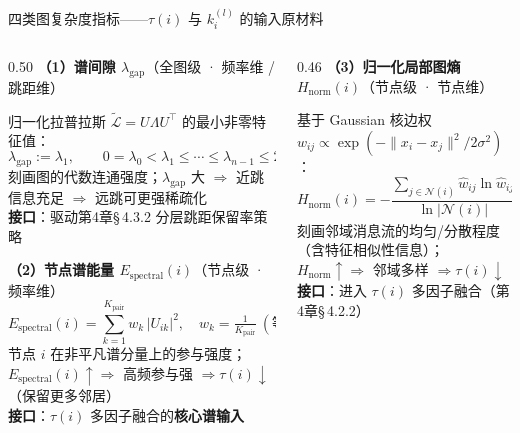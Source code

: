 \documentclass[aspectratio=169,9pt,xcolor=dvipsnames]{beamer}
\newcommand{\blue}[1]{\textcolor{mynavy}{#1}}
\begin{document}
\begin{frame}{四类图复杂度指标——$\tau(i)$ 与 $k_i^{(l)}$ 的输入原材料}
\begin{columns}[T]

\begin{column}{0.50\textwidth}
  \textbf{\blue{（1）谱间隙 $\lambda_{\mathrm{gap}}$}}（全图级 · 频率维 / 跳距维）

  归一化拉普拉斯 $\tilde{\mathcal{L}}=U\Lambda U^\top$ 的最小非零特征值：
  \begin{equation*}
    \lambda_{\mathrm{gap}}:=\lambda_1,\qquad
    0=\lambda_0<\lambda_1\leq\cdots\leq\lambda_{n-1}\leq 2
  \end{equation*}
  刻画图的代数连通强度；$\lambda_{\mathrm{gap}}$ 大 $\Rightarrow$ 近跳信息充足 $\Rightarrow$ 远跳可更强稀疏化\\
  \textbf{接口}：驱动第4章§\,4.3.2 分层跳距保留率策略

  \vspace{1cm}
  \textbf{\blue{（2）节点谱能量 $E_{\mathrm{spectral}}(i)$}}（节点级 · 频率维）
  \begin{equation*}
    E_{\mathrm{spectral}}(i)=\sum_{k=1}^{K_{\mathrm{pair}}} w_k\,|U_{ik}|^2,\quad
    w_k=\tfrac{1}{K_{\mathrm{pair}}}\ (\text{等权，任务无关})
  \end{equation*}
  节点 $i$ 在非平凡谱分量上的参与强度；\\
  $E_{\mathrm{spectral}}(i)\uparrow\Rightarrow$ 高频参与强 $\Rightarrow\tau(i)\downarrow$（保留更多邻居）\\
  \textbf{接口}：$\tau(i)$ 多因子融合的\textbf{核心谱输入}
\end{column}

\begin{column}{0.46\textwidth}
  \textbf{\blue{（3）归一化局部图熵 $H_{\mathrm{norm}}(i)$}}（节点级 · 节点维）

  基于 Gaussian 核边权 $w_{ij}\propto\exp(-\|x_i-x_j\|^2/2\sigma^2)$：
  \begin{equation*}
    H_{\mathrm{norm}}(i)=
    -\frac{\sum_{j\in\mathcal{N}(i)}\hat{w}_{ij}\ln\hat{w}_{ij}}
          {\ln|\mathcal{N}(i)|},\quad
    \hat{w}_{ij}=\frac{w_{ij}}{\sum_{k}w_{ik}}
  \end{equation*}
  刻画邻域消息流的均匀/分散程度（含特征相似性信息）；\\
  $H_{\mathrm{norm}}\uparrow\Rightarrow$ 邻域多样 $\Rightarrow\tau(i)\downarrow$\\
  \textbf{接口}：进入 $\tau(i)$ 多因子融合（第4章§\,4.2.2）


\end{column}
\end{columns}
\end{frame}
\end{document}
